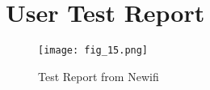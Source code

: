 \chapter{User Test Report }
\label{chap:appC}
\begin{figure}[htbp]
\centering
	  \texttt{[image: fig\_15.png]}
    \caption{Test Report from Newifi}
 \label{fig_15}
\end{figure}
